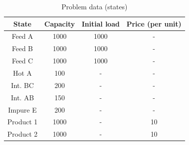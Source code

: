 \begin{table}[htbp]
\centering
\caption{Problem data (states)}
\label{tab:statelevels}
\begin{tabular}{@{}cccc@{}}
\toprule
\textbf{State} & \textbf{Capacity} & \textbf{Initial load} & \textbf{Price (per unit)} \\ \midrule
Feed A         & 1000              & 1000                  & -                         \\
Feed B         & 1000              & 1000                  & -                         \\
Feed C         & 1000              & 1000                  & -                         \\
Hot A          & 100               & -                     & -                         \\
Int. BC        & 200               & -                     & -                         \\
Int. AB        & 150               & -                     & -                         \\
Impure E       & 200               & -                     & -                         \\
Product 1      & 1000              & -                     & 10                        \\
Product 2      & 1000              & -                     & 10                        \\ \bottomrule
\end{tabular}
\end{table}

